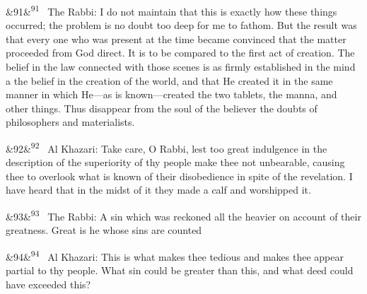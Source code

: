 \documentclass[12pt]{article}
\newcommand{\para}[1][]{\par\noindent\ifx&#1&\else\textsuperscript{\footnotesize #1}~\fi}
\begin{document}
\para[91] The Rabbi: I do not maintain that this is exactly how these things occurred; the problem is no doubt too deep for me to fathom. But the result was that every one who was present at the time became convinced that the matter proceeded from God direct. It is to be compared to the first act of creation. The belief in the law connected with those scenes is as firmly established in the mind a the belief in the creation of the world, and that He created it in the same manner in which He---as is known---created the two tablets, the manna, and other things. Thus disappear from the soul of the believer the doubts of philosophers and materialists.

\para[92] Al Khazari: Take care, O Rabbi, lest too great indulgence in the description of the superiority of thy people make thee not unbearable, causing thee to overlook what is known of their disobedience in spite of the revelation. I have heard that in the midst of it they made a calf and worshipped it.

\para[93] The Rabbi: A sin which was reckoned all the heavier on account of their greatness. Great is he whose sins are counted

\para[94] Al Khazari: This is what makes thee tedious and makes thee appear partial to thy people. What sin could be greater than this, and what deed could have exceeded this?
\end{document}
